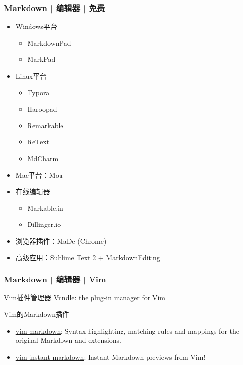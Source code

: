 \begin{frame}
  \frametitle{Markdown | 编辑器 | 免费}
  \begin{itemize}
    \item Windows平台
      \begin{itemize}
        \item MarkdownPad
	      \item MarkPad
      \end{itemize}
    \item Linux平台
      \begin{itemize}
        \item Typora
        \item Haroopad
        \item Remarkable
        \item ReText
        \item MdCharm
      \end{itemize}
    \item Mac平台：Mou
    \item 在线编辑器
      \begin{itemize}
	\item Markable.in
	\item Dillinger.io
      \end{itemize}
    \item 浏览器插件：MaDe (Chrome)
    \item 高级应用：Sublime Text 2 + MarkdownEditing
  \end{itemize}
\end{frame}

\begin{frame}
  \frametitle{Markdown | 编辑器 | Vim}
  \begin{block}{Vim插件管理器}
    \href{https://github.com/VundleVim/Vundle.vim}{Vundle}: the plug-in manager for Vim
  \end{block}
  \pause
  \begin{block}{Vim的Markdown插件}
    \begin{itemize}
      \item \href{https://github.com/plasticboy/vim-markdown}{vim-markdown}: Syntax highlighting, matching rules and mappings for the original Markdown and extensions.
      \item \href{https://github.com/suan/vim-instant-markdown}{vim-instant-markdown}: Instant Markdown previews from Vim! 
    \end{itemize}
  \end{block}
\end{frame}


